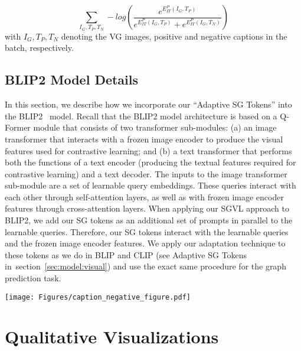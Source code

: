 \documentclass[11pt]{article}
\def\secref#1{section~\ref{#1}}
\newcommand{\Ig}{I_G}
\begin{document}
\small
\begin{equation} 
\sum_{\Ig,T_P,T_N} -log\left(\frac{e^{E_{IT}^P(I_G,T_P)}}{e^{E_{IT}^P(I_G,T_P)} +e^{E_{IT}^P(I_G,T_N)}}\right)
\end{equation}
\normalsize
with $I_G,T_P,T_N$ denoting the VG images, positive and negative captions in the batch, respectively.



\subsection{BLIP2 Model Details}
\label{supp:models:blip2}
In this section, we describe how we incorporate our ``Adaptive SG Tokens'' into the BLIP2~\cite{li2023blip2} model. Recall that the BLIP2 model architecture is based on a Q-Former module that consists of two transformer sub-modules: (a) an image transformer that interacts with a frozen image encoder to produce the visual features used for contrastive learning; and (b) a text transformer that performs both the functions of a text encoder (producing the textual features required for contrastive learning) and a text decoder. The inputs to the image transformer sub-module are a set of learnable query embeddings. These queries interact with each other through self-attention layers, as well as with frozen image encoder features through cross-attention layers. When applying our SGVL approach to BLIP2, we add our SG tokens as an additional set of prompts in parallel to the learnable queries. Therefore, our SG tokens interact with the learnable queries and the frozen image encoder features. We apply our adaptation technique to these tokens as we do in BLIP and CLIP (see Adaptive SG Tokens in~\secref{sec:model:visual}) and use the exact same procedure for the graph prediction task.  




\begin{figure*}
\centering
    \texttt{[image: Figures/caption\_negative\_figure.pdf]}
    \vspace{-3em}
    \label{supp:fig:negative}
\end{figure*}

\section{Qualitative Visualizations}
\end{document}
